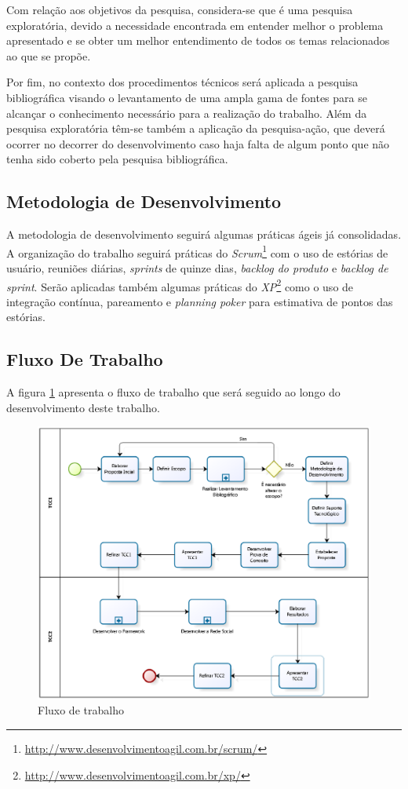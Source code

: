 Com relação aos objetivos da pesquisa, considera-se que é uma pesquisa exploratória, devido a necessidade encontrada em entender melhor o problema apresentado e se obter um melhor entendimento de todos os temas relacionados ao que se propõe.

Por fim, no contexto dos procedimentos técnicos será aplicada a pesquisa bibliográfica visando o levantamento de uma ampla gama de fontes para se alcançar o conhecimento necessário para a realização do trabalho. Além da pesquisa exploratória têm-se também a aplicação da pesquisa-ação, que deverá ocorrer no decorrer do desenvolvimento caso haja falta de algum ponto que não tenha sido coberto pela pesquisa bibliográfica.

\subsection{Metodologia de Desenvolvimento}

A metodologia de desenvolvimento seguirá algumas práticas ágeis já consolidadas. A organização do trabalho seguirá práticas do \textit{Scrum}\footnote{\url{http://www.desenvolvimentoagil.com.br/scrum/}} com o uso de estórias de usuário, reuniões diárias, \textit{sprints} de quinze dias, \textit{backlog do produto} e \textit{backlog de sprint}. Serão aplicadas também algumas práticas do \textit{XP}\footnote{\url{http://www.desenvolvimentoagil.com.br/xp/}} como o uso de integração contínua, pareamento e \textit{planning poker} para estimativa de pontos das estórias.

\subsection{Fluxo De Trabalho}

A figura \ref{processo tcc} apresenta o fluxo de trabalho que será seguido ao longo do desenvolvimento deste trabalho.

\newpage

\begin{figure}
	\centering
	\includegraphics[scale=0.8]{figuras/capitulo4/processo_tcc.eps}
	\caption{Fluxo de trabalho}
	\label{processo tcc}
\end{figure}

